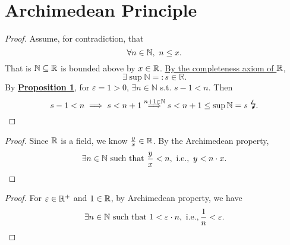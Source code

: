 \documentclass[11pt,openany]{article}
\begin{document}
\section{Archimedean Principle}
\begin{center}

\end{center}
\begin{proof}
Assume, for contradiction, that \[
\forall n\in\mathbb{N},\ n\leq x.
\] That is $\mathbb{N}\subseteq\mathbb{R}$ is bounded above by $x\in\mathbb{R}$. \underline{By the completeness axiom of $\mathbb{R}$}, \[
\exists\sup\mathbb{N}=:s\in\mathbb{R}.
\] By \hyperlink{pro1}{\textbf{Proposition 1}}, for $\varepsilon=1>0$, $\exists n\in\mathbb{N}$ s.t. $s-1<n$. Then \[
s-1<n\implies s<n+1\overset{n+1\in\N}{\implies}s<n+1\leq\sup\N=s\ \text{\Large\lightning}.
\]
\end{proof}
\vfill
{}
\begin{proof}
	Since $\mathbb{R}$ is a field, we know $\frac{y}{x}\in\mathbb{R}$. By the Archimedean property, \[
	\exists n\in\N\ \text{such that}\ \frac{y}{x}<n,\ \ie,\ y<n\cdot x.
	\]
\end{proof}
\begin{center}

\end{center}
\begin{proof}
	For $\varepsilon\in\mathbb{R}^+$ and $1\in\mathbb{R}$, by Archimedean property, we have \[
	\exists n\in\N\ \text{such that}\ 1<\varepsilon\cdot n,\ \ie, \frac{1}{n}<\varepsilon.
	\]
\end{proof}
\begin{center}
	
\end{center}
\end{document}
